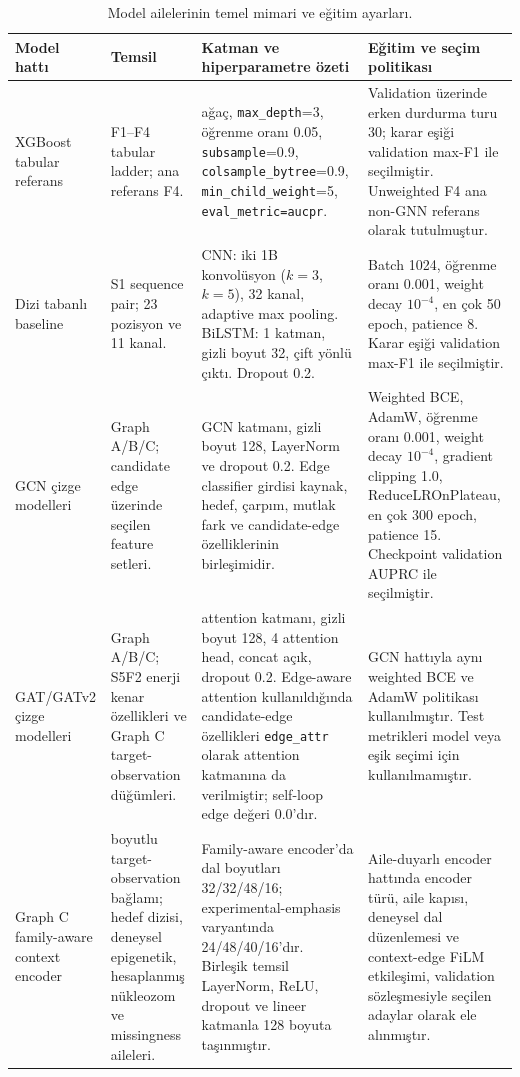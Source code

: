 \begin{table}[htbp]
\caption{Model ailelerinin temel mimari ve eğitim ayarları.}
\label{tab:model-architecture-summary}
\centering
\scriptsize
\begin{tabularx}{\textwidth}{>{\raggedright\arraybackslash}p{} >{\raggedright\arraybackslash}p{} >{\raggedright\arraybackslash}p{} >{\raggedright\arraybackslash}X}
\toprule\toprule
Model hattı & Temsil & Katman ve hiperparametre özeti & Eğitim ve seçim politikası\\
\midrule
XGBoost tabular referans & F1--F4 tabular ladder; ana referans F4. & 400 ağaç, \texttt{max\_depth}=3, öğrenme oranı 0.05, \texttt{subsample}=0.9, \texttt{colsample\_bytree}=0.9, \texttt{min\_child\_weight}=5, \texttt{eval\_metric=aucpr}. & Validation üzerinde erken durdurma turu 30; karar eşiği validation max-F1 ile seçilmiştir. Unweighted F4 ana non-GNN referans olarak tutulmuştur.\\
Dizi tabanlı baseline & S1 sequence pair; 23 pozisyon ve 11 kanal. & CNN: iki 1B konvolüsyon (\(k=3\), \(k=5\)), 32 kanal, adaptive max pooling. BiLSTM: 1 katman, gizli boyut 32, çift yönlü çıktı. Dropout 0.2. & Batch 1024, öğrenme oranı 0.001, weight decay \(10^{-4}\), en çok 50 epoch, patience 8. Karar eşiği validation max-F1 ile seçilmiştir.\\
GCN çizge modelleri & Graph A/B/C; candidate edge üzerinde seçilen feature setleri. & 2 GCN katmanı, gizli boyut 128, LayerNorm ve dropout 0.2. Edge classifier girdisi kaynak, hedef, çarpım, mutlak fark ve candidate-edge özelliklerinin birleşimidir. & Weighted BCE, AdamW, öğrenme oranı 0.001, weight decay \(10^{-4}\), gradient clipping 1.0, ReduceLROnPlateau, en çok 300 epoch, patience 15. Checkpoint validation AUPRC ile seçilmiştir.\\
GAT/GATv2 çizge modelleri & Graph A/B/C; S5F2 enerji kenar özellikleri ve Graph C target-observation düğümleri. & 2 attention katmanı, gizli boyut 128, 4 attention head, concat açık, dropout 0.2. Edge-aware attention kullanıldığında candidate-edge özellikleri \texttt{edge\_attr} olarak attention katmanına da verilmiştir; self-loop edge değeri 0.0'dır. & GCN hattıyla aynı weighted BCE ve AdamW politikası kullanılmıştır. Test metrikleri model veya eşik seçimi için kullanılmamıştır.\\
Graph C family-aware context encoder & 212 boyutlu target-observation bağlamı; hedef dizisi, deneysel epigenetik, hesaplanmış nükleozom ve missingness aileleri. & Family-aware encoder'da dal boyutları 32/32/48/16; experimental-emphasis varyantında 24/48/40/16'dır. Birleşik temsil LayerNorm, ReLU, dropout ve lineer katmanla 128 boyuta taşınmıştır. & Aile-duyarlı encoder hattında encoder türü, aile kapısı, deneysel dal düzenlemesi ve context-edge FiLM etkileşimi, validation sözleşmesiyle seçilen adaylar olarak ele alınmıştır.\\

\end{tabularx}
\end{table}
